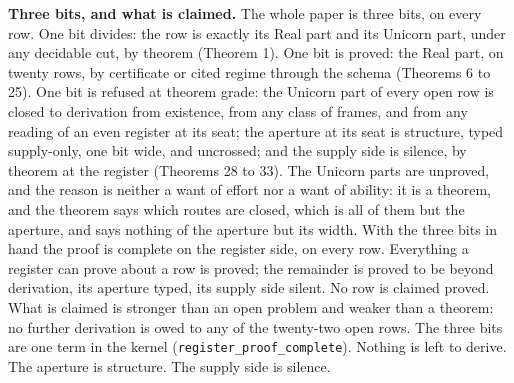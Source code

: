 \documentclass[10pt,twocolumn]{article}
\begin{document}
\textbf{Three bits, and what is claimed.} The whole paper is three bits,
on every row. One bit divides: the row is exactly its Real part and its
Unicorn part, under any decidable cut, by theorem (Theorem 1). One bit
is proved: the Real part, on twenty rows, by certificate or cited regime
through the schema (Theorems 6 to 25). One bit is refused at theorem
grade: the Unicorn part of every open row is closed to derivation from
existence, from any class of frames, and from any reading of an even
register at its seat; the aperture at its seat is structure, typed
supply-only, one bit wide, and uncrossed; and the supply side is
silence, by theorem at the register (Theorems 28 to 33). The Unicorn
parts are unproved, and the reason is neither a want of effort nor a
want of ability: it is a theorem, and the theorem says which routes are
closed, which is all of them but the aperture, and says nothing of the
aperture but its width. With the three bits in hand the proof is
complete on the register side, on every row. Everything a register can
prove about a row is proved; the remainder is proved to be beyond
derivation, its aperture typed, its supply side silent. No row is
claimed proved. What is claimed is stronger than an open problem and
weaker than a theorem: no further derivation is owed to any of the
twenty-two open rows. The three bits are one term in the kernel
(\texttt{register\_proof\_complete}). Nothing is left to derive. The
aperture is structure. The supply side is silence.
\end{document}
